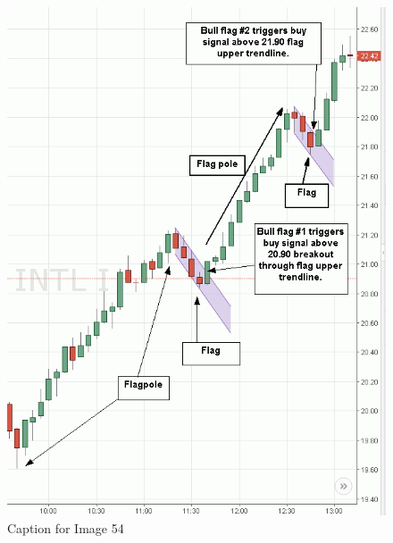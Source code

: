 \documentclass{article}
\begin{document}
\vspace{10pt}

\begin{figure}[!htb]
    \centering
    \includegraphics[width=\textwidth]{imgs/54.png}
    \caption{Caption for Image 54}
\end{figure}

\vspace{10pt}
\end{document}

